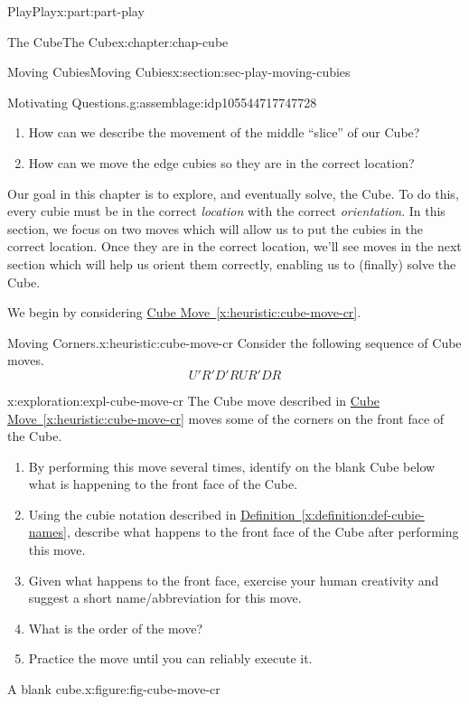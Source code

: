 \documentclass[oneside,10pt,]{book}
\newcommand{\xreffont}{\relax}
\numberwithin{equation}{section}
\begin{document}
\begin{partptx}{Play}{}{Play}{}{}{x:part:part-play}
\begin{chapterptx}{The Cube}{}{The Cube}{}{}{x:chapter:chap-cube}
\begin{sectionptx}{Moving Cubies}{}{Moving Cubies}{}{}{x:section:sec-play-moving-cubies}
\begin{assemblage}{Motivating Questions.}{g:assemblage:idp105544717747728}
\begin{enumerate}
\item{}How can we describe the movement of the middle ``slice'' of our Cube?%
\item{}How can we move the edge cubies so they are in the correct location?%
\end{enumerate}
%
\end{assemblage}
\begin{introduction}{}%
Our goal in this chapter is to explore, and eventually solve, the Cube. To do this, every cubie must be in the correct \emph{location} with the correct \emph{orientation}. In this section, we focus on two moves which will allow us to put the cubies in the correct location. Once they are in the correct location, we'll see moves in the next section which will help us orient them correctly, enabling us to (finally) solve the Cube.%
\end{introduction}%
We begin by considering \hyperref[x:heuristic:cube-move-cr]{Cube Move~{\xreffont\ref{x:heuristic:cube-move-cr}}}.%
\begin{heuristic}{Moving Corners.}{}{x:heuristic:cube-move-cr}%
Consider the following sequence of Cube moves.%
%
\begin{equation*}
U' R' D' R U R' D R
\end{equation*}
\end{heuristic}
\begin{exploration}{}{x:exploration:expl-cube-move-cr}%
The Cube move described in \hyperref[x:heuristic:cube-move-cr]{Cube Move~{\xreffont\ref{x:heuristic:cube-move-cr}}} moves some of the corners on the front face of the Cube.%
%
\begin{enumerate}
\item{}By performing this move several times, identify on the blank Cube below what is happening to the front face of the Cube.%
\item{}Using the cubie notation described in \hyperref[x:definition:def-cubie-names]{Definition~{\xreffont\ref{x:definition:def-cubie-names}}}, describe what happens to the front face of the Cube after performing this move.%
\item{}Given what happens to the front face, exercise your human creativity and suggest a short name\slash{}abbreviation for this move.%
\item{}What is the order of the move?%
\item{}Practice the move until you can reliably execute it.%
\end{enumerate}
\begin{figureptx}{A blank cube.}{x:figure:fig-cube-move-cr}{}%

\end{figureptx}
\end{exploration}
\end{sectionptx}
\end{chapterptx}
\end{partptx}
\end{document}
